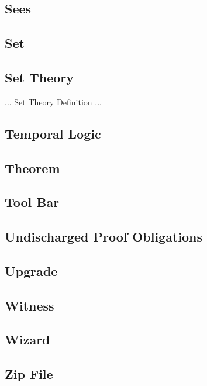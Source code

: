 
\subsection{Sees}
\label{sees}

\subsection{Set}
\label{set}

\subsection{Set Theory}
\label{set_theory}

... Set Theory Definition ...

\subsection{Temporal Logic}
\label{temporal_logic}

\subsection{Theorem}
\label{theorem}

\subsection{Tool Bar}
\label{tool_bar}

\subsection{Undischarged Proof Obligations}
\label{undischarged_proof_obligations}

\subsection{Upgrade}
\label{Upgrade}


\subsection{Witness}
\label{witness}

\subsection{Wizard}
\label{wizard}

\subsection{Zip File}
\label{zip_file}


